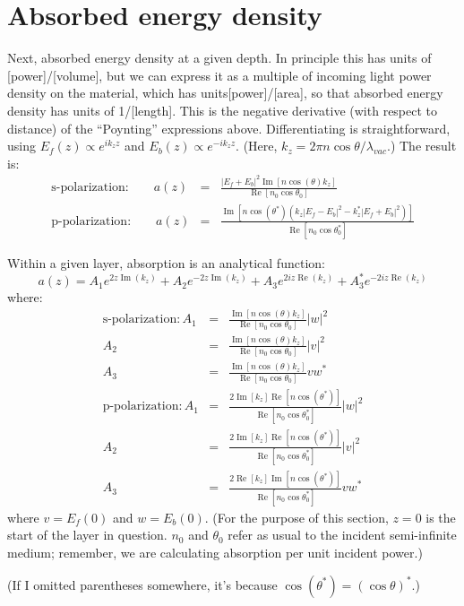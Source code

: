 \documentclass[12pt]{article}
\newcommand{\bea}{\begin{eqnarray*}} %
\newcommand{\eea}{\end{eqnarray*}} %
\renewcommand{\(}{\left(}
\renewcommand{\)}{\right)}
\renewcommand{\Im}{\operatorname{Im}}
\renewcommand{\Re}{\operatorname{Re}}
\begin{document}
\section{Absorbed energy density}
Next, absorbed energy density at a given depth. In principle this has units of [power]/[volume], but we can express it as a multiple of incoming light power density on the material, which has units[power]/[area], so that absorbed energy density has units of 1/[length]. This is the negative derivative (with respect to distance) of the ``Poynting'' expressions above. Differentiating is straightforward, using $E_f(z) \propto e^{i k_z z}$ and $E_b(z) \propto e^{-i k_z z}$. (Here, $k_z=2\pi n\cos\theta/\lambda_{vac}$.) The result is:
\bea
\text{s-polarization:} \qquad a(z) &=& \frac{|E_f+E_b|^2 \Im\left[ n \cos(\theta) k_z\right] }{\Re\left[ n_0 \cos \theta_0 \right] } \\
\text{p-polarization:} \qquad a(z) &=& \frac{\Im\left[ n \cos(\theta^*)\(k_z|E_f-E_b|^2-k_z^*|E_f+E_b|^2\)\right]}{\Re \left[ n_0 \cos \theta_0^* \right] }
\eea

Within a given layer, absorption is an analytical function:
$$a(z) = A_1e^{2 z \Im(k_z)} + A_2e^{-2 z \Im(k_z)} + A_3e^{2iz\Re(k_z)} + A_3^* e^{-2iz \Re(k_z)}$$
where:
\bea
\text{s-polarization}: A_1 &=& \frac{\Im\left[ n \cos(\theta) k_z\right] }{\Re\left[ n_0 \cos \theta_0 \right] }|w|^2\\
A_2 &=& \frac{\Im\left[ n \cos(\theta) k_z\right] }{\Re \left[ n_0 \cos \theta_0 \right] }|v|^2\\
A_3 &=& \frac{\Im\left[ n \cos(\theta) k_z\right] }{\Re \left[ n_0 \cos \theta_0 \right] }vw^*\\
\text{p-polarization}: A_1 &=& \frac{2\Im\left[ k_z\right] \Re\left[ n \cos(\theta^*)\right] }{\Re \left[ n_0 \cos \theta_0^* \right] } |w|^2\\
A_2 &=& \frac{2\Im\left[ k_z \right] \Re \left[ n \cos(\theta^*)\right] }{\Re \left[ n_0 \cos \theta_0^* \right] } |v|^2\\
A_3 &=& \frac{2\Re\left[ k_z \right] \Im \left[ n \cos(\theta^*)\right] }{\Re \left[ n_0 \cos \theta_0^* \right] } vw^*
\eea
where $v = E_f(0)$ and $w=E_b(0)$. (For the purpose of this section, $z=0$ is the start of the layer in question. $n_0$ and $\theta_0$ refer as usual to the incident semi-infinite medium; remember, we are calculating absorption per unit incident power.)

(If I omitted parentheses somewhere, it's because $\cos (\theta^*) = (\cos \theta)^*$.)
\end{document}
